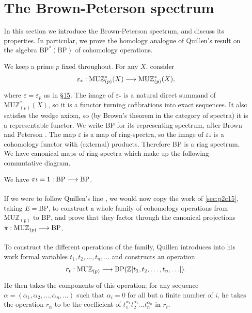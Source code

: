\documentclass[../main]{subfiles}
\begin{document}
\chapter{The Brown-Peterson spectrum}
\label{sec:p2c16}
In this section we introduce the Brown-Peterson spectrum, and discuss its properties. In particular, we prove the homology analogue of Quillen's result on the algebra $\mathrm{BP}^\ast(\mathrm {BP})$ of cohomology operations.

We keep a prime $p$ fixed throughout. For any $X$, consider \[\varepsilon_\ast : \mathrm{MU} \mathbb Z_{(p)}^\ast(X) \lar{} \mathrm{MU} \mathbb Z_{(p)}^\ast(X),\] where $\varepsilon = \varepsilon_p$ as in \hyperref[sec:p2c15]{\S 15}. The image of $\varepsilon_\ast$ is a natural direct summand of $\mathrm {MU} \mathbb Z_{(p)}^\ast(X)$, so it is a functor turning cofibrations into exact sequences. It also satisfies the wedge axiom, so (by Brown's theorem in the category of spectra) it is a representable functor. We write $\mathrm{BP}$ for its representing spectrum, after Brown and Peterson \cite{brownpeterson}. The map $\varepsilon$ is a map of ring-spectra, so the image of $\varepsilon_\ast$ is a cohomology functor with (external) products. Therefore BP is a ring spectrum. We have canonical maps of ring-spectra which make up the following commutative diagram.

\begin{center}
\end{center}

We have $\pi\iota = 1 : \mathrm{BP} \lar{} \mathrm{BP}$.

If we were to follow Quillen's line \cite{quillen}, we would now copy the work of \ref{sec:p2c15}, taking $E = \mathrm{BP}$, to construct a whole family of cohomology operations from $\mathrm{MU} \mathbb Z_{(p)}$ to $\mathrm{BP}$, and prove that they factor through the canonical projections $\pi : \mathrm{MU} \mathbb Z_{(p)} \lar{} \mathrm{BP}$. 

To construct the different operations of the family, Quillen introduces into his work formal variables $t_1, t_2, \ldots, t_n, \ldots$ and constructs an operation \[r_t : \mathrm{MU} \mathbb Z_{(p)} \lar{} \mathrm{BP}(\mathbb Z[t_1, t_2, \ldots, t_n, \ldots]).\] He then takes the components of this operation; for any sequence $\alpha = (\alpha_1, \alpha_2, \ldots, \alpha_n, \ldots)$ such that $\alpha_i = 0$ for all but a finite number of $i$, he takes the operation $r_\alpha$ to be the coefficient of $t_1^{\alpha_1} t_2^{\alpha_2} \ldots t_n^{\alpha_n}$ in $r_t$. 
\end{document}
